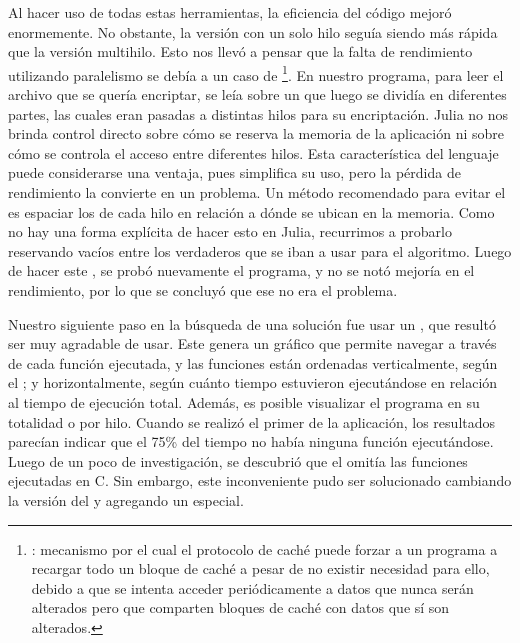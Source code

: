 Al hacer uso de todas estas herramientas, la eficiencia del código mejoró enormemente. No obstante, la versión con un solo hilo seguía siendo más rápida que la versión multihilo. Esto nos llevó a pensar que la falta de rendimiento utilizando paralelismo se debía a un caso de \footnote{: mecanismo por el cual el protocolo de caché puede forzar a un programa a recargar todo un bloque de caché a pesar de no existir necesidad para ello, debido a que se intenta acceder periódicamente a datos que nunca serán alterados pero que comparten bloques de caché con datos que sí son alterados.}. En nuestro programa, para leer el archivo que se quería encriptar, se leía sobre un  que luego se dividía en diferentes partes, las cuales eran pasadas a distintas hilos para su encriptación. Julia no nos brinda control directo sobre cómo se reserva la memoria de la aplicación ni sobre cómo se controla el acceso entre diferentes hilos. Esta característica del lenguaje puede considerarse una ventaja, pues simplifica su uso, pero la pérdida de rendimiento la convierte en un problema. Un método recomendado para evitar el  es espaciar los  de cada hilo en relación a dónde se ubican en la memoria. Como no hay una forma explícita de hacer esto en Julia, recurrimos a probarlo reservando  vacíos entre los verdaderos  que se iban a usar para el algoritmo. Luego de hacer este , se probó nuevamente el programa, y no se notó mejoría en el rendimiento, por lo que se concluyó que ese no era el problema.

Nuestro siguiente paso en la búsqueda de una solución fue usar un , que resultó ser muy agradable de usar. Este  genera un gráfico que permite navegar a través de cada función ejecutada, y las funciones están ordenadas verticalmente, según el ; y horizontalmente, según cuánto tiempo estuvieron ejecutándose en relación al tiempo de ejecución total. Además, es posible visualizar el programa en su totalidad o por hilo. Cuando se realizó el primer  de la aplicación, los resultados parecían indicar que el 75\% del tiempo no había ninguna función ejecutándose. Luego de un poco de investigación, se descubrió que el  omitía las funciones ejecutadas en C. Sin embargo, este inconveniente pudo ser solucionado cambiando la versión del  y agregando un  especial.


